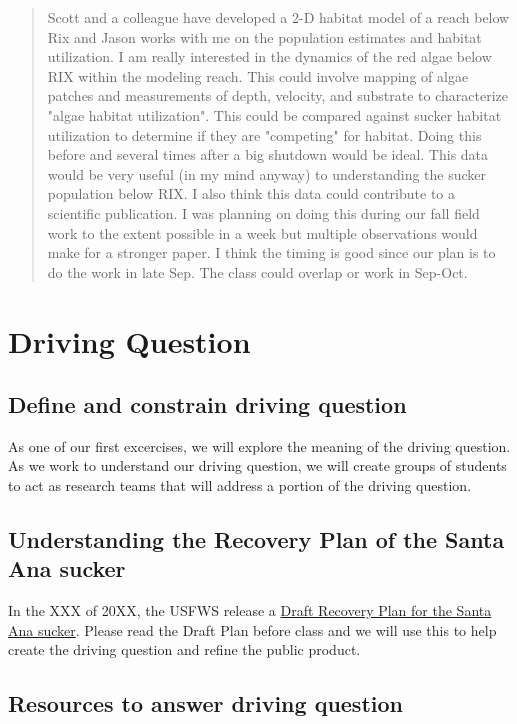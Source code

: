 \documentclass{article}\usepackage[]{graphicx}\usepackage[]{color}
\begin{document}
\begin{quote}
Scott and a colleague have developed a 2-D habitat model of a reach below Rix and Jason works with me on the population estimates and habitat utilization. I am really interested in the dynamics of the red algae below RIX within the modeling reach. This could involve mapping of algae patches and measurements of depth, velocity, and substrate to characterize "algae habitat utilization". This could be compared against sucker habitat utilization to determine if they are "competing" for habitat. Doing this before and several times after a big shutdown would be ideal. This data would be very useful (in my mind anyway) to understanding the sucker population below RIX. I also think this data could contribute to a scientific publication. I was planning on doing this during our fall field work to the extent possible in a week but multiple observations would make for a stronger paper. I think the timing is good since our plan is to do the work in late Sep. The class could overlap or work in Sep-Oct.
\end{quote}


\section{Driving Question}

\subsection{Define and constrain driving question}

As one of our first excercises, we will explore the meaning of the driving question. As we work to understand our driving question, we will create groups of students to act as research teams that will address a portion of the driving question.

\subsection{Understanding the Recovery Plan of the Santa Ana sucker}

In the XXX of 20XX, the USFWS release a \href{https://www.fws.gov/carlsbad/SpeciesStatusList/RP/201411xx_Draft%20RP_SASU.pdf}{Draft Recovery Plan for the Santa Ana sucker}. Please read the Draft Plan before class and we will use this to help create the driving question and refine the public product. 

\subsection{Resources to answer driving question}
\end{document}
